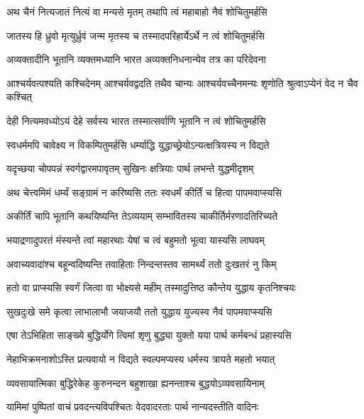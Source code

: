 \twolineshloka
{अथ चैनं नित्यजातं नित्यं वा मन्यसे मृतम्}
{तथापि त्वं महाबाहो नैवं शोचितुमर्हसि}%

\twolineshloka
{जातस्य हि ध्रुवो मृत्युर्ध्रुवं जन्म मृतस्य च}
{तस्मादपरिहार्येऽर्थे न त्वं शोचितुमर्हसि}%

\twolineshloka
{अव्यक्तादीनि भूतानि व्यक्तमध्यानि भारत}
{अव्यक्तनिधनान्येव तत्र का परिदेवना}%

\fourlineindentedshloka
{आश्चर्यवत्पश्यति कश्चिदेनम्}
{आश्चर्यवद्वदति तथैव चान्यः}
{आश्चर्यवच्चैनमन्यः शृणोति}
{श्रुत्वाऽप्येनं वेद न चैव कश्चित्}%

\twolineshloka
{देही नित्यमवध्योऽयं देहे सर्वस्य भारत}
{तस्मात्सर्वाणि भूतानि न त्वं शोचितुमर्हसि}%

\twolineshloka
{स्वधर्ममपि चावेक्ष्य न विकम्पितुमर्हसि}
{धर्म्याद्धि युद्धाच्छ्रेयोऽन्यत्क्षत्रियस्य न विद्यते}%

\twolineshloka
{यदृच्छया चोपपन्नं स्वर्गद्वारमपावृतम्}
{सुखिनः क्षत्रियाः पार्थ लभन्ते युद्धमीदृशम्}%

\twolineshloka
{अथ चेत्त्वमिमं धर्म्यं सङ्ग्रामं न करिष्यसि}
{ततः स्वधर्मं कीर्तिं च हित्वा पापमवाप्स्यसि}%

\twolineshloka
{अकीर्तिं चापि भूतानि कथयिष्यन्ति तेऽव्ययाम्}
{सम्भावितस्य चाकीर्तिर्मरणादतिरिच्यते}%

\twolineshloka
{भयाद्रणादुपरतं मंस्यन्ते त्वां महारथाः}
{येषां च त्वं बहुमतो भूत्वा यास्यसि लाघवम्}%

\twolineshloka
{अवाच्यवादांश्च बहून्वदिष्यन्ति तवाहिताः}
{निन्दन्तस्तव सामर्थ्यं ततो दुःखतरं नु किम्}%

\twolineshloka
{हतो वा प्राप्स्यसि स्वर्गं जित्वा वा भोक्ष्यसे महीम्}
{तस्मादुत्तिष्ठ कौन्तेय युद्धाय कृतनिश्चयः}%

\twolineshloka
{सुखदुःखे समे कृत्वा लाभालाभौ जयाजयौ}
{ततो युद्धाय युज्यस्व नैवं पापमवाप्स्यसि}%

\twolineshloka
{एषा तेऽभिहिता साङ्ख्ये बुद्धिर्योगे त्विमां शृणु}
{बुद्ध्या युक्तो यया पार्थ कर्मबन्धं प्रहास्यसि}%

\twolineshloka
{नेहाभिक्रमनाशोऽस्ति प्रत्यवायो न विद्यते}
{स्वल्पमप्यस्य धर्मस्य त्रायते महतो भयात्}%

\twolineshloka
{व्यवसायात्मिका बुद्धिरेकेह कुरुनन्दन}
{बहुशाखा ह्यनन्ताश्च बुद्धयोऽव्यवसायिनाम्}%

\twolineshloka
{यामिमां पुष्पितां वाचं प्रवदन्त्यविपश्चितः}
{वेदवादरताः पार्थ नान्यदस्तीति वादिनः}%

